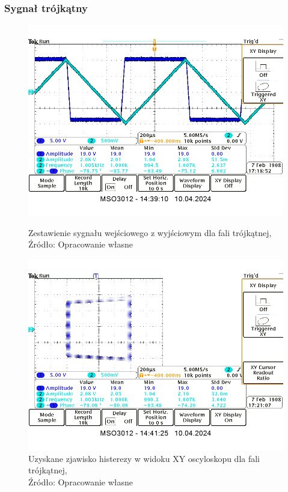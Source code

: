 \documentclass{article}
\begin{document}
    \subsubsection{Sygnał trójkątny}

      \begin{figure}[!ht]
        \begin{minipage}{.5\textwidth}
            \centering
            \includegraphics[scale=0.35]{grafiki/ramp_wyj.png}
            \caption{Zestawienie sygnału wejściowego z wyjściowym dla fali trójkątnej,
            \\Źródło: Opracowanie własne}
        \end{minipage}
        \begin{minipage}{.5\textwidth}
            \centering
            \includegraphics[scale=0.35]{grafiki/ramp_Histereza.png} 
            \caption{Uzyskane zjawisko histerezy w widoku XY oscyloskopu dla fali trójkątnej,
            \\Źródło: Opracowanie własne}
        \end{minipage}
      \end{figure}
\end{document}
